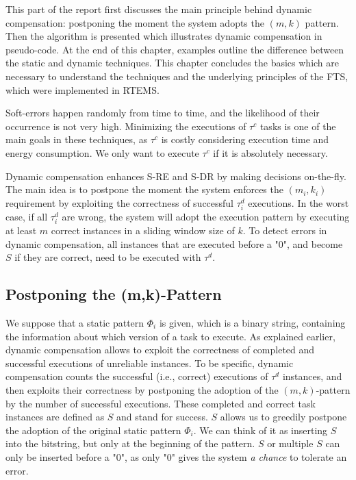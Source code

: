 This part of the report first discusses the main principle behind dynamic compensation: postponing the moment the system adopts the $(m,k)$ pattern. Then the algorithm is presented which illustrates dynamic compensation in pseudo-code. At the end of this chapter, examples outline the difference between the static and dynamic techniques.
This chapter concludes the basics which are necessary to understand the techniques and the underlying principles of the FTS, which were implemented in RTEMS.

Soft-errors happen randomly from time to time, and the likelihood of their occurrence is not very high. Minimizing the executions of $\tau^c$ tasks is one of the main goals in these techniques, as $\tau^c$ is costly considering execution time and energy consumption. We only want to execute $\tau^c$ if it is absolutely necessary.

Dynamic compensation enhances S-RE and S-DR by making decisions on-the-fly. The main idea is to postpone the moment the system enforces the $(m_i,k_i)$ requirement by exploiting the correctness of successful $\tau_i^d$ executions. In the worst case, if all $\tau_i^d$ are wrong, the system will adopt the execution pattern by executing at least $m$ correct instances in a sliding window size of $k$. To detect errors in dynamic compensation, all instances that are executed before a "0", and become $S$ if they are correct, need to be executed with $\tau^d$.

\subsection{Postponing the (m,k)-Pattern}
We suppose that a static pattern $\Phi_i$ is given, which is a binary string, containing the information about which version of a task to execute. As explained earlier, dynamic compensation allows to exploit the correctness of completed and successful executions of unreliable instances. To be specific, dynamic compensation counts the successful (i.e., correct) executions of $\tau^d$ instances, and then exploits their correctness by postponing the adoption of the $(m,k)$-pattern by the number of successful executions. These completed and correct task instances are defined as $S$ and stand for success. $S$ allows us to greedily postpone the adoption of the original static pattern $\Phi_i$. We can think of it as inserting $S$ into the bitstring, but only at the beginning of the pattern. $S$ or multiple $S$ can only be inserted before a "0", as only "0" gives the system \textit{a chance} to tolerate an error. 

